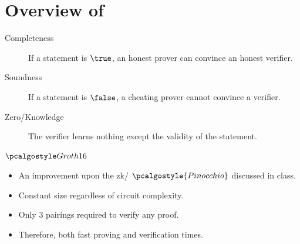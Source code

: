 \section{Overview of }

\begin{frame}{}
    \begin{description}
        \item[Completeness] If a statement is $\true$, an honest prover can convince an honest verifier.
        \item[Soundness] If a statement is $\false$, a cheating prover cannot convince a verifier.
        \item[Zero\-/Knowledge] The verifier learns nothing except the validity of the statement.
    \end{description}

\end{frame}

\begin{frame}{$\groth$}
    \begin{itemize}
        \item An improvement upon the zk\-/ $\pcalgostyle{Pinocchio}$ discussed in class.
        \item {} Constant size regardless of circuit complexity.
        \item Only $3$ pairings required to verify any proof.
        \item Therefore, both fast proving and verification times.
    \end{itemize}
\end{frame}
